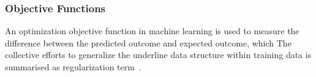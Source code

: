 \subsubsection{Objective Functions}
An optimization objective function in machine learning is used to measure the difference between the predicted outcome and expected outcome, which  The collective efforts to generalize the underline data structure within training data is summarised as regularization term~\cite{goodfellow_2015}.  